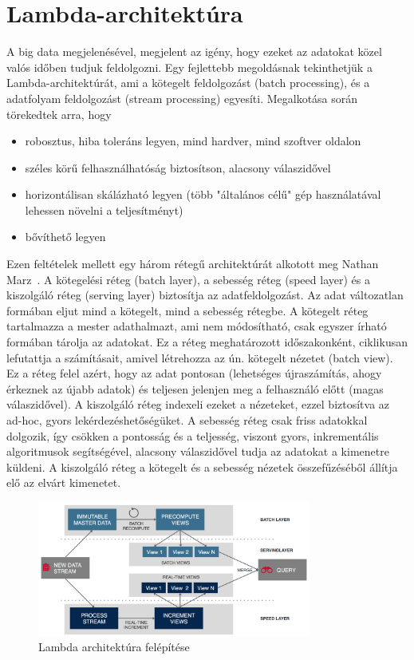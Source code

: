 \documentclass[a4paper,12pt]{article}
\begin{document}
\section{Lambda-architektúra}
A big data megjelenésével, megjelent az igény, hogy ezeket az adatokat közel valós időben tudjuk feldolgozni. Egy fejlettebb megoldásnak tekinthetjük a Lambda-architektúrát, ami a kötegelt feldolgozást (batch processing), és a adatfolyam feldolgozást (stream processing) egyesíti. Megalkotása során törekedtek arra, hogy 
\begin{itemize}
\item robosztus, hiba toleráns legyen, mind hardver, mind szoftver oldalon
\item széles körű felhasználhatóság biztosítson, alacsony válaszidővel
\item horizontálisan skálázható legyen (több "általános célű" gép használatával lehessen növelni a teljesítményt)
\item bővíthető legyen
\end{itemize}

Ezen feltételek mellett egy három rétegű architektúrát alkotott meg Nathan Marz~\cite{lambda}. A kötegelési réteg (batch layer), a sebesség réteg (speed layer) és a kiszolgáló réteg (serving layer) biztosítja az adatfeldolgozást. Az adat változatlan formában eljut mind a kötegelt, mind a sebesség rétegbe. A kötegelt réteg tartalmazza a mester adathalmazt, ami nem módosítható, csak egyszer írható formában tárolja az adatokat. Ez a réteg meghatározott időszakonként, ciklikusan lefutattja a számításait, amivel létrehozza az ún. kötegelt nézetet (batch view). Ez a réteg felel azért, hogy az adat pontosan (lehetséges újraszámítás, ahogy érkeznek az újabb adatok) és teljesen jelenjen meg a felhasználó előtt (magas válaszidővel).  A kiszolgáló réteg indexeli ezeket a nézeteket, ezzel biztosítva az ad-hoc, gyors lekérdezéshetőségüket. \linebreak
A sebesség réteg csak friss adatokkal dolgozik, így csökken a pontosság és a teljesség, viszont gyors, inkrementális algoritmusok segítségével, alacsony válaszidővel tudja az adatokat a kimenetre küldeni. A kiszolgáló réteg a kötegelt és a sebesség nézetek összefűzéséből állítja elő az elvárt kimenetet.

\begin{figure}[ht!]
\centering
\includegraphics[width=90mm]{img/lambda.png}
\caption{Lambda architektúra felépítése \label{overflow}}
\end{figure}
\end{document}
